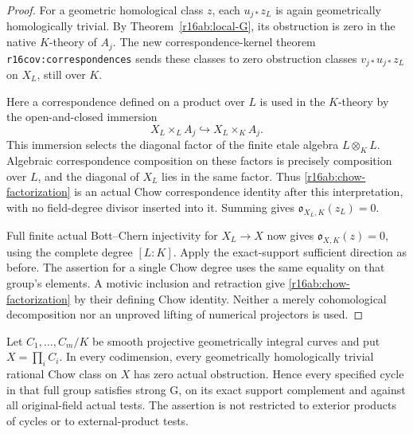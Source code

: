 \begin{proof}
For a geometric homological class $z$, each $u_{j*}z_L$ is again
geometrically homologically trivial.  By
Theorem~\ref{r16ab:local-G}, its obstruction is zero in the native
$K$-theory of $A_j$.  The new correspondence-kernel theorem
\texttt{r16cov:correspondences} sends these classes to zero
obstruction classes $v_{j*}u_{j*}z_L$ on $X_L$, still over $K$.

Here a correspondence defined on a product over $L$ is used in the
$K$-theory by the open-and-closed immersion
\[
                X_L\times_LA_j\hookrightarrow X_L\times_KA_j.
\]
This immersion selects the diagonal factor of the finite etale
algebra $L\otimes_KL$.  Algebraic correspondence composition on
these factors is precisely composition over $L$, and the diagonal
of $X_L$ lies in the same factor.  Thus
\eqref{r16ab:chow-factorization} is an actual Chow correspondence
identity after this interpretation, with no field-degree divisor
inserted into it.  Summing gives
$\mathfrak o_{X_L,K}(z_L)=0$.

Full finite actual Bott--Chern injectivity for $X_L\to X$ now gives
$\mathfrak o_{X,K}(z)=0$, using the complete degree $[L:K]$.
Apply the exact-support sufficient direction as before.
The assertion for a single Chow degree uses the same equality on
that group's elements.  A motivic inclusion and retraction give
\eqref{r16ab:chow-factorization} by their defining Chow identity.
Neither a merely cohomological decomposition nor an unproved lifting
of numerical projectors is used.
\end{proof}

\begin{corollary}
\label{r16ab:curve-products}
Let $C_1,\ldots,C_m/K$ be smooth projective geometrically integral
curves and put $X=\prod_iC_i$.  In every codimension, every
geometrically homologically trivial rational Chow class on $X$ has
zero actual obstruction.  Hence every specified cycle in that full
group satisfies strong G, on its exact support complement and
against all original-field actual tests.  The assertion is not
restricted to exterior products of cycles or to external-product tests.
\end{corollary}

